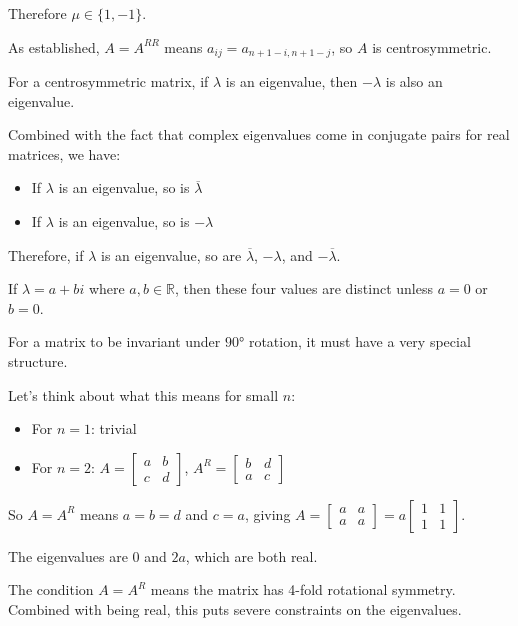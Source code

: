 \documentclass[12pt,a4paper]{article}
\theoremstyle{definition}
\begin{document}
        Therefore $\mu \in \{1, -1\}$.

        As established, $A = A^{RR}$ means $a_{ij} = a_{n+1-i,n+1-j}$, so $A$ is centrosymmetric.

        For a centrosymmetric matrix, if $\lambda$ is an eigenvalue, then $-\lambda$ is also an eigenvalue.

        Combined with the fact that complex eigenvalues come in conjugate pairs for real matrices, we have:
        \begin{itemize}
            \item If $\lambda$ is an eigenvalue, so is $\overline{\lambda}$
            \item If $\lambda$ is an eigenvalue, so is $-\lambda$
        \end{itemize}

        Therefore, if $\lambda$ is an eigenvalue, so are $\overline{\lambda}$, $-\lambda$, and $-\overline{\lambda}$.

        If $\lambda = a + bi$ where $a, b \in \mathbb{R}$, then these four values are distinct unless $a = 0$ or $b = 0$.

        For a matrix to be invariant under $90°$ rotation, it must have a very special structure.

        Let's think about what this means for small $n$:
        \begin{itemize}
            \item For $n = 1$: trivial
            \item For $n = 2$: $A = \begin{bmatrix} a & b \\ c & d \end{bmatrix}$, $A^R = \begin{bmatrix} b & d \\ a & c \end{bmatrix}$
        \end{itemize}

        So $A = A^R$ means $a = b = d$ and $c = a$, giving $A = \begin{bmatrix} a & a \\ a & a \end{bmatrix} = a\begin{bmatrix} 1 & 1 \\ 1 & 1 \end{bmatrix}$.

        The eigenvalues are $0$ and $2a$, which are both real.

        The condition $A = A^R$ means the matrix has 4-fold rotational symmetry. Combined with being real, this puts severe constraints on the eigenvalues.
\end{document}

